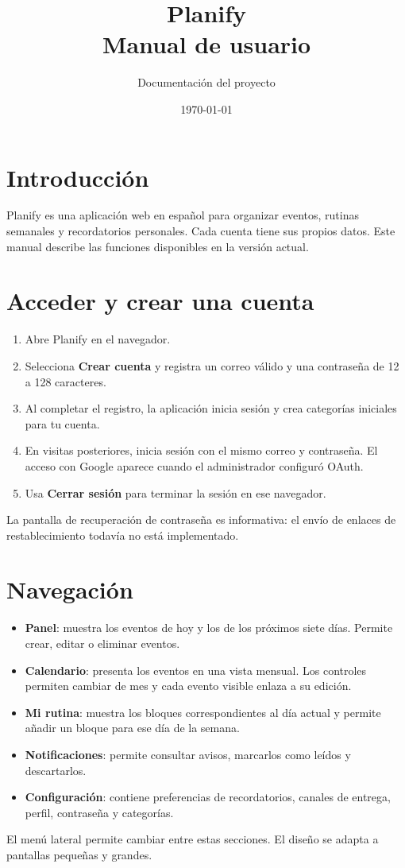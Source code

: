 \documentclass[12pt,a4paper]{article}
\title{Planify\\Manual de usuario}
\author{Documentación del proyecto}
\date{\today}
\begin{document}
\maketitle
\tableofcontents
\newpage

\section{Introducción}
Planify es una aplicación web en español para organizar eventos, rutinas semanales y recordatorios personales. Cada cuenta tiene sus propios datos. Este manual describe las funciones disponibles en la versión actual.

\section{Acceder y crear una cuenta}
\begin{enumerate}
  \item Abre Planify en el navegador.
  \item Selecciona \textbf{Crear cuenta} y registra un correo válido y una contraseña de 12 a 128 caracteres.
  \item Al completar el registro, la aplicación inicia sesión y crea categorías iniciales para tu cuenta.
  \item En visitas posteriores, inicia sesión con el mismo correo y contraseña. El acceso con Google aparece cuando el administrador configuró OAuth.
  \item Usa \textbf{Cerrar sesión} para terminar la sesión en ese navegador.
\end{enumerate}

La pantalla de recuperación de contraseña es informativa: el envío de enlaces de restablecimiento todavía no está implementado.

\section{Navegación}
\begin{itemize}
  \item \textbf{Panel}: muestra los eventos de hoy y los de los próximos siete días. Permite crear, editar o eliminar eventos.
  \item \textbf{Calendario}: presenta los eventos en una vista mensual. Los controles permiten cambiar de mes y cada evento visible enlaza a su edición.
  \item \textbf{Mi rutina}: muestra los bloques correspondientes al día actual y permite añadir un bloque para ese día de la semana.
  \item \textbf{Notificaciones}: permite consultar avisos, marcarlos como leídos y descartarlos.
  \item \textbf{Configuración}: contiene preferencias de recordatorios, canales de entrega, perfil, contraseña y categorías.
\end{itemize}
El menú lateral permite cambiar entre estas secciones. El diseño se adapta a pantallas pequeñas y grandes.
\end{document}
